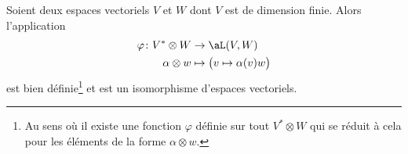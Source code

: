 \begin{proposition}      \label{PROPooKJTCooVTXWAQ}
	Soient deux espaces vectoriels \( V\) et \( W\) dont \( V\) est de dimension finie. Alors l'application
	\begin{equation}
		\begin{aligned}
			\varphi\colon V^*\otimes W & \to \aL(V,W)                            \\
			\alpha\otimes w            & \mapsto \big( v\mapsto \alpha(v)w \big)
		\end{aligned}
	\end{equation}
	est bien définie\footnote{Au sens où il existe une fonction \( \varphi\) définie sur tout \( V^*\otimes W\) qui se réduit à cela pour les éléments de la forme \( \alpha\otimes w\).} et est un isomorphisme d'espaces vectoriels.
\end{proposition}

